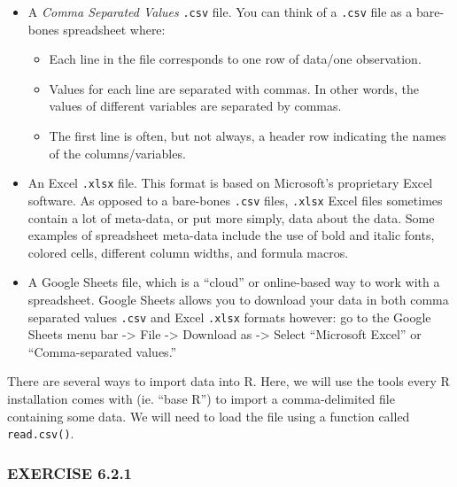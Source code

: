 \documentclass[
]{book}
\providecommand{\tightlist}{%
  \setlength{\itemsep}{0pt}\setlength{\parskip}{0pt}}
\begin{document}
\begin{itemize}
\tightlist
\item
  A \emph{Comma Separated Values} \texttt{.csv} file. You can think of a \texttt{.csv} file as a bare-bones spreadsheet where:

  \begin{itemize}
  \tightlist
  \item
    Each line in the file corresponds to one row of data/one observation.\\
  \item
    Values for each line are separated with commas. In other words, the values of different variables are separated by commas.\\
  \item
    The first line is often, but not always, a header row indicating the names of the columns/variables.\\
  \end{itemize}
\item
  An Excel \texttt{.xlsx} file. This format is based on Microsoft's proprietary Excel software. As opposed to a bare-bones \texttt{.csv} files, \texttt{.xlsx} Excel files sometimes contain a lot of meta-data, or put more simply, data about the data. Some examples of spreadsheet meta-data include the use of bold and italic fonts, colored cells, different column widths, and formula macros.\\
\item
  A Google Sheets file, which is a ``cloud'' or online-based way to work with a spreadsheet. Google Sheets allows you to download your data in both comma separated values \texttt{.csv} and Excel \texttt{.xlsx} formats however: go to the Google Sheets menu bar -\textgreater{} File -\textgreater{} Download as -\textgreater{} Select ``Microsoft Excel'' or ``Comma-separated values.''
\end{itemize}

There are several ways to import data into R. Here, we will use the tools every R installation comes with (ie. ``base R'') to import a comma-delimited file containing some data. We will need to load the file using a function called \texttt{read.csv()}.

\hypertarget{exercise-6.2.1}{%
\subsubsection*{EXERCISE 6.2.1}\label{exercise-6.2.1}}
\end{document}
